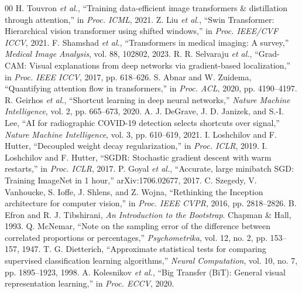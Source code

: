 \documentclass[conference]{IEEEtran}
\begin{document}
\begin{thebibliography}{00}
 H. Touvron \emph{et al.}, ``Training data-efficient image transformers \& distillation through attention,'' in \emph{Proc. ICML}, 2021.
 Z. Liu \emph{et al.}, ``Swin Transformer: Hierarchical vision transformer using shifted windows,'' in \emph{Proc. IEEE/CVF ICCV}, 2021.
 F. Shamshad \emph{et al.}, ``Transformers in medical imaging: A survey,'' \emph{Medical Image Analysis}, vol. 88, 102802, 2023.
 R. R. Selvaraju \emph{et al.}, ``Grad-CAM: Visual explanations from deep networks via gradient-based localization,'' in \emph{Proc. IEEE ICCV}, 2017, pp. 618--626.
 S. Abnar and W. Zuidema, ``Quantifying attention flow in transformers,'' in \emph{Proc. ACL}, 2020, pp. 4190--4197.
 R. Geirhos \emph{et al.}, ``Shortcut learning in deep neural networks,'' \emph{Nature Machine Intelligence}, vol. 2, pp. 665--673, 2020.
 A. J. DeGrave, J. D. Janizek, and S.-I. Lee, ``AI for radiographic COVID-19 detection selects shortcuts over signal,'' \emph{Nature Machine Intelligence}, vol. 3, pp. 610--619, 2021.
 I. Loshchilov and F. Hutter, ``Decoupled weight decay regularization,'' in \emph{Proc. ICLR}, 2019.
 I. Loshchilov and F. Hutter, ``SGDR: Stochastic gradient descent with warm restarts,'' in \emph{Proc. ICLR}, 2017.
 P. Goyal \emph{et al.}, ``Accurate, large minibatch SGD: Training ImageNet in 1 hour,'' arXiv:1706.02677, 2017.
 C. Szegedy, V. Vanhoucke, S. Ioffe, J. Shlens, and Z. Wojna, ``Rethinking the Inception architecture for computer vision,'' in \emph{Proc. IEEE CVPR}, 2016, pp. 2818--2826.
 B. Efron and R. J. Tibshirani, \emph{An Introduction to the Bootstrap}. Chapman \& Hall, 1993.
 Q. McNemar, ``Note on the sampling error of the difference between correlated proportions or percentages,'' \emph{Psychometrika}, vol. 12, no. 2, pp. 153--157, 1947.
 T. G. Dietterich, ``Approximate statistical tests for comparing supervised classification learning algorithms,'' \emph{Neural Computation}, vol. 10, no. 7, pp. 1895--1923, 1998.
 A. Kolesnikov \emph{et al.}, ``Big Transfer (BiT): General visual representation learning,'' in \emph{Proc. ECCV}, 2020.
\end{thebibliography}
\end{document}

